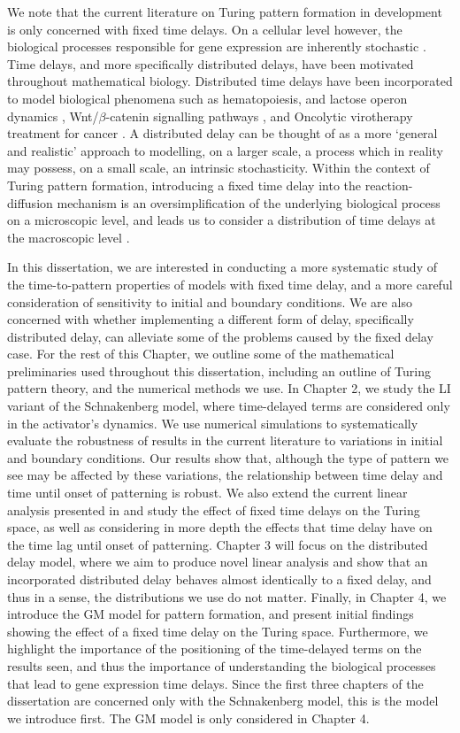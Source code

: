 We note that the current literature on Turing pattern formation in development is only concerned with fixed time delays. On a cellular level however, the biological processes responsible for gene expression are inherently stochastic \cite{raj,elowitz,mcadams,paulsson}. Time delays, and more specifically distributed delays, have been motivated throughout mathematical biology. Distributed time delays have been incorporated to model biological phenomena such as hematopoiesis, and lactose operon dynamics \cite{newdist}, Wnt/$\beta$-catenin signalling pathways \cite{signal}, and Oncolytic virotherapy treatment for cancer \cite{cancer}. A distributed delay can be thought of as a more `general and realistic' \cite{cancer} approach to modelling, on a larger scale, a process which in reality may possess, on a small scale, an intrinsic stochasticity. Within the context of Turing pattern formation, introducing a fixed time delay into the reaction-diffusion mechanism is an oversimplification of the underlying biological process on a microscopic level, and leads us to consider a distribution of time delays at the macroscopic level \cite{bratsun,krausenew}.

In this dissertation, we are interested in conducting a more systematic study of the time-to-pattern properties of models with fixed time delay, and a more careful consideration of sensitivity to initial and boundary conditions. We are also concerned with whether implementing a different form of delay, specifically distributed delay, can alleviate some of the problems caused by the fixed delay case. For the rest of this Chapter, we outline some of the mathematical preliminaries used throughout this dissertation, including an outline of Turing pattern theory, and the numerical methods we use. In Chapter 2, we study the LI variant of the Schnakenberg model, where time-delayed terms are considered only in the activator's dynamics. We use numerical simulations to systematically evaluate the robustness of results in the current literature to variations in initial and boundary conditions. Our results show that, although the type of pattern we see may be affected by these variations, the relationship between time delay and time until onset of patterning is robust. We also extend the current linear analysis presented in \cite{yigaffneyli} and study the effect of fixed time delays on the Turing space, as well as considering in more depth the effects that time delay have on the time lag until onset of patterning. Chapter 3 will focus on the distributed delay model, where we aim to produce novel linear analysis and show that an incorporated distributed delay behaves almost identically to a fixed delay, and thus in a sense, the distributions we use do not matter. Finally, in Chapter 4, we introduce the GM model for pattern formation, and present initial findings showing the effect of a fixed time delay on the Turing space. Furthermore, we highlight the importance of the positioning of the time-delayed terms on the results seen, and thus the importance of understanding the biological processes that lead to gene expression time delays. Since the first three chapters of the dissertation are concerned only with the Schnakenberg model, this is the model we introduce first. The GM model is only considered in Chapter 4.

